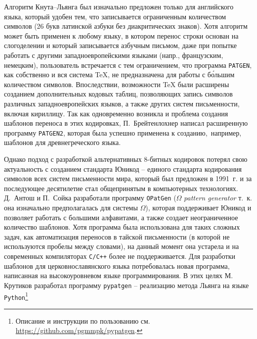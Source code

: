 \documentclass[12pt,a4paper,oneside]{extarticle}
\begin{document}
Алгоритм Кнута--Льянга был изначально предложен только для английского языка, который удобен тем, что записывается ограниченным количеством символов (26 букв латинской азбуки без диакритических знаков). Хотя алгоритм может быть применен к любому языку, в котором перенос строки основан на слогоделении и который записывается азбучным письмом, даже при попытке работать с другими западноевропейскими языками (напр., французским, немецким), пользователь встречается с тем ограничением, что программа \verb+PATGEN+, как собственно и вся система \TeX{}, не предназначена для работы с бо́льшим количеством символов. Впоследствии, возможности \TeX{} были расширены созданием дополнительных кодовых таблиц, позволяющих запись символов различных западноевропейских языков\autocite[Кодировка \textenglish{Extended \TeX{} Font Encoding Scheme} (ET). См. ][]{ferguson1990}, а также других систем письменности, включая кириллицу\autocite[Описание существующих кодировок см. ][]{mittelbach2016}. Так как одновременно возникла и проблема создания шаблонов переноса в этих кодировках, П.~Брейтенлохнер написал расширенную программу \verb+PATGEN2+\autocite[См. описание в пособии ][]{patgen2}, которая была успешно применена к созданию, например, шаблонов для древнегреческого языка\autocite[][]{haralambous1992}.

Однако подход с разработкой альтернативных 8-битных кодировок потерял свою актуальность с созданием стандарта Юникод -- единого стандарта 
кодирования символов всех систем письменности мира, который был предложен в 1991~г. и за последующее десятилетие стал общепринятым в 
компьютерных технологиях. Д.~Антош и  П.~Сойка разработали программу \verb+OPatGen+ ($\Omega$ \emph{pattern generator} т.~к. она изначально 
предполагалась для системы $\Omega$), которая поддерживает Юникод и позволяет работать с большими алфавитами, а также создает неограниченное 
количество шаблонов\autocite[][]{opatgen}. Хотя программа была использована для таких сложных задач, как автоматизация переносов в тайской 
письменности (в которой не используются пробелы между словами)\autocite[][]{sojka2003}, на данный момент она устарела и на современных 
компиляторах \verb!C/C++! более не поддерживается. Для разработки шаблонов для церковнославянского языка потребовалась новая программа, 
написанная на  высокоуровневом языке программирования. В этих целях М. Крутиков разработал программу \verb+pypatgen+ -- реализацию метода 
Льянга на языке \verb+Python+\footnote{Описание и инструкции по пользованию см. \url{https://github.com/pgmmpk/pypatgen}.}
\end{document}
